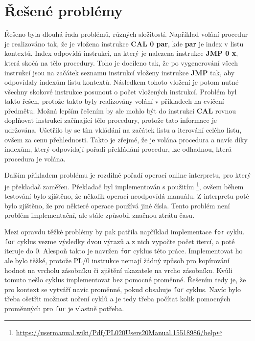 \documentclass[12pt, letterpaper]{article}
\begin{document}
\section{Řešené problémy}
Řešeno byla dlouhá řada problémů, různých složitostí. Například volání procedur je realizováno tak, že je vložena
instrukce \textbf{CAL 0 par}, kde \textbf{par} je index v listu kontextů. Index odpovídá instrukci, na který je nalezena
instrukce \textbf{JMP 0 x}, která skočá na tělo procedury. Toho je docíleno tak, že po vygenerování všech instrukcí jsou
na začátek seznamu instrukcí vloženy instrukce \textbf{JMP} tak, aby odpovídaly indexům listu kontextů. Následkem tohoto
vložení je potom nutné všechny skokové instrukce posunout o počet vložených instrukcí. Problém byl takto řešen, protože
takto byly realizovány volání v příkladech na cvičení předmětu. Možná lepším řešením by ale mohlo být do instrukcí 
\textbf{CAL} rovnou doplňovat instrukci začínající tělo procedury, protože tato informace je udržována. Ušetřilo by
se tím vkládání na začátek listu a iterování celého listu, ovšem za cenu přehlednosti. Takto je zřejmé, že je volána
procedura a navíc díky indexům, který odpovídají pořadí překládání procedur, lze odhadnou, která procedura je volána.

Dalším příkladem problému je rozdílné pořadí operací online interpretu, pro který je překladač zaměřen. Překladač byl
implementován s použitím \footnote{\url{https://usermanual.wiki/Pdf/PL020Users20Manual.15518986/help}},
ovšem během testování bylo zjištěno, že několik operací neodpovídá manuálu. Z interpretu poté bylo zjištěno, že pro
některé operace používá jiné čísla. Tento problém není problém implementační, ale stále způsobil značnou ztrátu času.

Mezi opravdu těžké problémy by pak patřila například implementace \texttt{for} cyklu. \texttt{for} cyklus vezme 
výsledky dvou výrazů a z nich vypočte počet itercí, a poté iteruje do 0. Alespoň takto je navržen \texttt{for} cyklus
této práce. Implementovat ho ale bylo těžké, protože PL/0 instrukce nemají žádný způsob pro kopírování hodnot na 
vrcholu zásobníku či zjištění ukazatele na vrcho zásobníku. Kvůli tomuto nešlo cyklus implementovat bez pomocné 
proměnné. Řešením tedy je, že pro kontext se vytváří navíc proměnné, pokud obsahuje \texttt{for} cyklus. Navíc bylo
třeba ošetřit možnost noření cyklů a je tedy třeba počítat kolik pomocných proměnných pro \texttt{for} je 
vlastně potřeba.
%
\end{document}

